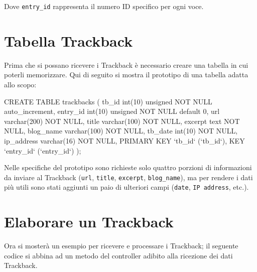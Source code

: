 Dove \verb|entry_id| rappresenta il numero ID specifico per ogni voce.

\section*{Tabella Trackback}

Prima che si possano ricevere i Trackback è necessario creare una tabella in cui poterli memorizzare. Qui di seguito si mostra il prototipo di una tabella adatta allo scopo:

\begin{code}
CREATE TABLE trackbacks (
 tb_id int(10) unsigned NOT NULL auto_increment,
 entry_id int(10) unsigned NOT NULL default 0,
 url varchar(200) NOT NULL,
 title varchar(100) NOT NULL,
 excerpt text NOT NULL,
 blog_name varchar(100) NOT NULL,
 tb_date int(10) NOT NULL,
 ip_address varchar(16) NOT NULL,
 PRIMARY KEY `tb_id` (`tb_id`),
 KEY `entry_id` (`entry_id`)
);
\end{code}

Nelle specifiche del prototipo sono richieste solo quattro porzioni di informazioni da inviare al Trackback  (\verb|url|, \verb|title|, \verb|excerpt|, \verb|blog_name|),  ma per rendere i dati più utili sono stati aggiunti un paio di ulteriori campi (\verb|date|, \verb|IP address|, etc.).

\section*{Elaborare un Trackback}

Ora si mosterà un esempio per ricevere e processare i Trackback; il seguente codice si abbina ad un metodo del controller adibito alla ricezione dei dati Trackback.


